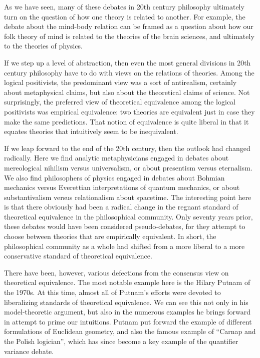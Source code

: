 As we have seen, many of these debates in 20th century philosophy
ultimately turn on the question of how one theory is related to
another.  For example, the debate about the mind-body relation can be
framed as a question about how our folk theory of mind is related to
the theories of the brain sciences, and ultimately to the theories of
physics.

If we step up a level of abstraction, then even the most general
divisions in 20th century philosophy have to do with views on the
relations of theories.  Among the logical positivists, the predominant
view was a sort of antirealism, certainly about metaphysical claims,
but also about the theoretical claims of science.  Not surprisingly,
the preferred view of theoretical equivalence among the logical
positivists was empirical equivalence: two theories are equivalent
just in case they make the same predictions.  That notion of
equivalence is quite liberal in that it equates theories that
intuitively seem to be inequivalent.

If we leap forward to the end of the 20th century, then the outlook
had changed radically.  Here we find analytic metaphysicians engaged
in debates about mereological nihilism versus universalism, or about
presentism versus eternalism.  We also find philosophers of physics
engaged in debates about Bohmian mechanics versus Everettian
interpretations of quantum mechanics, or about substantivalism versus
relationalism about spacetime.  The interesting point here is that
there obviously had been a radical change in the regnant standard of
theoretical equivalence in the philosophical community.  Only seventy
years prior, these debates would have been considered pseudo-debates,
for they attempt to choose between theories that are empirically
equivalent.  In short, the philosophical community as a whole had
shifted from a more liberal to a more conservative standard of
theoretical equivalence.

There have been, however, various defections from the consensus view
on theoretical equivalence.  The most notable example here is the
Hilary Putnam of the 1970s.  At this time, almost all of Putnam's
efforts were devoted to liberalizing standards of theoretical
equivalence.  We can see this not only in his model-theoretic
argument, but also in the numerous examples he brings forward in
attempt to prime our intuitions.  Putnam put forward the example of
different formulations of Euclidean geometry, and also the famous
example of ``Carnap and the Polish logician'', which has since become
a key example of the quantifier variance debate.

